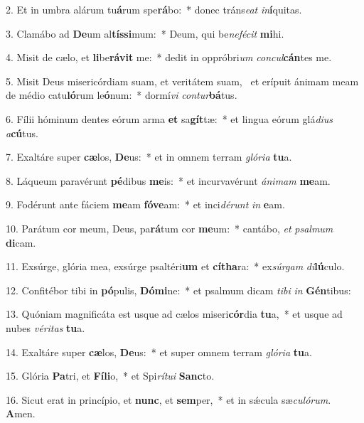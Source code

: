 2. Et in umbra alárum tu\textbf{á}rum spe\textbf{rá}bo:~*  donec tráns\textit{e}\textit{at} \textit{in}\textbf{í}quitas.\

3. Clamábo ad \textbf{De}um al\textbf{tís}\textbf{si}mum:~*  Deum, qui be\textit{ne}\textit{fé}\textit{cit} \textbf{mi}hi.\

4. Misit de cælo, et \textbf{li}be\textbf{rá}\textbf{vit} me:~*  dedit in oppróbri\textit{um} \textit{con}\textit{cul}\textbf{cán}tes me.\

5. Misit Deus misericórdiam suam, et veritátem suam, \dag\  et erípuit ánimam meam de médio catu\textbf{ló}rum le\textbf{ó}num:~*  dormí\textit{vi} \textit{con}\textit{tur}\textbf{bá}tus.\

6. Fílii hóminum dentes eórum arma \textbf{et} sa\textbf{gít}tæ:~*  et lingua eórum glá\textit{di}\textit{us} \textit{a}\textbf{cú}tus.\

7. Exaltáre super \textbf{cæ}los, \textbf{De}us:~*  et in omnem terram \textit{gló}\textit{ri}\textit{a} \textbf{tu}a.\

8. Láqueum paravérunt \textbf{pé}dibus \textbf{me}is:~*  et incurvavérunt \textit{á}\textit{ni}\textit{mam} \textbf{me}am.\

9. Fodérunt ante fáciem \textbf{me}am \textbf{fó}\textbf{ve}am:~*  et inci\textit{dé}\textit{runt} \textit{in} \textbf{e}am.\

10. Parátum cor meum, Deus, pa\textbf{rá}tum cor \textbf{me}um:~*  cantábo, \textit{et} \textit{psal}\textit{mum} \textbf{di}cam.\

11. Exsúrge, glória mea, exsúrge psaltéri\textbf{um} et \textbf{cí}\textbf{tha}ra:~*  ex\textit{súr}\textit{gam} \textit{di}\textbf{lú}culo.\

12. Confitébor tibi in \textbf{pó}pulis, \textbf{Dó}\textbf{mi}ne:~*  et psalmum dicam \textit{ti}\textit{bi} \textit{in} \textbf{Gén}tibus:\

13. Quóniam magnificáta est usque ad cælos miseri\textbf{cór}dia \textbf{tu}a,~*  et usque ad nubes \textit{vé}\textit{ri}\textit{tas} \textbf{tu}a.\

14. Exaltáre super \textbf{cæ}los, \textbf{De}us:~*  et super omnem terram \textit{gló}\textit{ri}\textit{a} \textbf{tu}a.\

15. Glória \textbf{Pa}tri, et \textbf{Fí}\textbf{li}o,~*  et Spi\textit{rí}\textit{tu}\textit{i} \textbf{Sanc}to.\

16. Sicut erat in princípio, et \textbf{nunc}, et \textbf{sem}per,~*  et in sǽcula sæ\textit{cu}\textit{ló}\textit{rum}. \textbf{A}men.\

